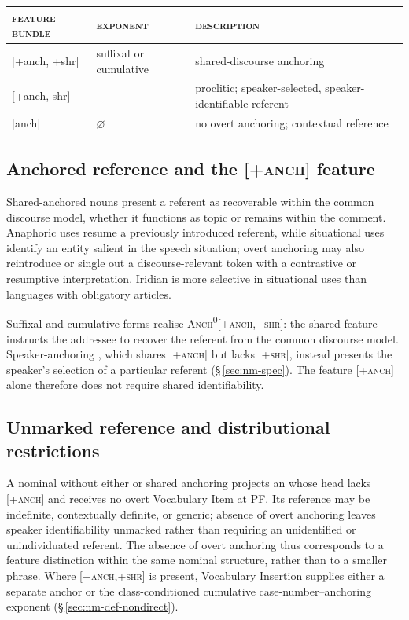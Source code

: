 \medskip
\begin{center}
\begin{tabularx}{0.88\textwidth}{l l L}
  \toprule
  \textsc{feature bundle} & \textsc{exponent} & \textsc{description} \\
  \midrule
  {[+anch, +shr]} & suffixal or cumulative & shared-discourse anchoring \\
  {[+anch, \textminus{}shr]} &  & proclitic; speaker-selected, speaker-identifiable referent \\
  {[\textminus{}anch]} & $\varnothing$ & no overt anchoring; contextual reference \\
  \bottomrule
\end{tabularx}
\end{center}
\medskip

\subsection{Anchored reference and the [\textsc{+anch}] feature}
\label{sec:nm-def-semantics}

Shared-anchored nouns present a referent as recoverable within the common
discourse model, whether it functions as topic or remains within the comment.
Anaphoric uses resume a previously introduced referent, while situational
uses identify an entity salient in the speech situation; overt anchoring may
also reintroduce or single out a discourse-relevant token with a contrastive
or resumptive interpretation. Iridian is more selective in situational uses
than languages with obligatory articles.

Suffixal and cumulative forms realise \textsc{Anch\textsuperscript{0}}[\textsc{+anch,+shr}]:
the shared feature instructs the addressee to recover the referent from the
common discourse model. Speaker-anchoring , which shares
[\textsc{+anch}] but lacks [\textsc{+shr}], instead presents the speaker's
selection of a particular referent (§\,\ref{sec:nm-spec}). The feature
[\textsc{+anch}] alone therefore does not require shared identifiability.

\subsection{Unmarked reference and distributional restrictions}
\label{sec:nm-bare-noun}
\label{sec:nm-def-restrictions}

A nominal without either  or shared anchoring projects an
 whose head lacks [\textsc{+anch}] and receives no overt
Vocabulary Item at PF. Its reference may be indefinite, contextually definite,
or generic; absence of overt anchoring leaves speaker identifiability
unmarked rather than requiring an unidentified or unindividuated referent.
The absence of overt anchoring thus corresponds to a feature distinction within the same
nominal structure, rather than to a smaller phrase. Where
[\textsc{+anch,+shr}] is present, Vocabulary Insertion supplies either a separate anchor or the
class-conditioned cumulative case-number--anchoring exponent (§\,\ref{sec:nm-def-nondirect}).


